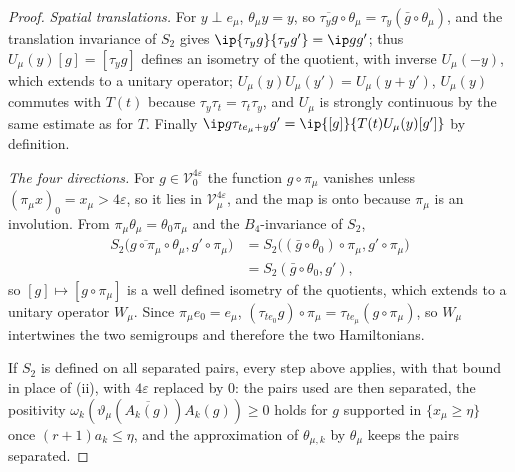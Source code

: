 \begin{proof}
\emph{Spatial translations.} For $y\perp e_\mu$, $\theta_\mu y=y$, so
$\overline{\tau_yg}\circ\theta_\mu=\tau_y(\bar g\circ\theta_\mu)$, and the
translation invariance of $S_2$ gives $\ip{\tau_yg}{\tau_yg'}=\ip g{g'}$;
thus $U_\mu(y)[g]=[\tau_yg]$ defines an isometry of the quotient, with
inverse $U_\mu(-y)$, which extends to a unitary operator; $U_\mu(y)U_\mu(y')
=U_\mu(y+y')$, $U_\mu(y)$ commutes with $T(t)$ because $\tau_y\tau_t=\tau_t
\tau_y$, and $U_\mu$ is strongly continuous by the same estimate as for
$T$. Finally $\ip g{\tau_{te_\mu+y}g'}=\ip{[g]}{T(t)U_\mu(y)[g']}$ by
definition.

\emph{The four directions.} For $g\in\mathcal V^{4\varepsilon}_0$ the
function $g\circ\pi_\mu$ vanishes unless $(\pi_\mu x)_0=x_\mu>4
\varepsilon$, so it lies in $\mathcal V^{4\varepsilon}_\mu$, and the map is
onto because $\pi_\mu$ is an involution. From $\pi_\mu\theta_\mu=\theta_0
\pi_\mu$ and the $B_4$-invariance of $S_2$,
\begin{align*}
S_2\bigl(\overline{g\circ\pi_\mu}\circ\theta_\mu,g'\circ\pi_\mu\bigr)&=
S_2\bigl((\bar g\circ\theta_0)\circ\pi_\mu,g'\circ\pi_\mu\bigr)\\
&=S_2(\bar g\circ\theta_0,g'),
\end{align*}
so $[g]\mapsto[g\circ\pi_\mu]$ is a well defined isometry of the quotients,
which extends to a unitary operator $W_\mu$. Since $\pi_\mu e_0=e_\mu$,
$(\tau_{te_0}g)\circ\pi_\mu=\tau_{te_\mu}(g\circ\pi_\mu)$, so $W_\mu$
intertwines the two semigroups and therefore the two Hamiltonians.

If $S_2$ is defined on all separated pairs, every step above applies, with that bound in place of (ii), with
$4\varepsilon$ replaced by $0$: the pairs used are then separated, the
positivity $\omega_k(\vartheta_\mu(\overline{A_k(g)})A_k(g))\ge0$ holds for
$g$ supported in $\{x_\mu\ge\eta\}$ once $(r+1)a_k\le\eta$, and the
approximation of $\theta_{\mu,k}$ by $\theta_\mu$ keeps the pairs separated.


\end{proof}
